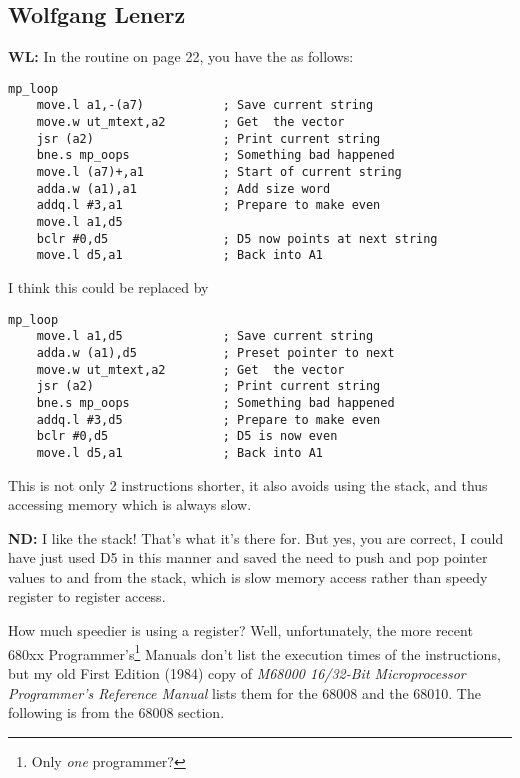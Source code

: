 \subsection{Wolfgang Lenerz}

\textbf{WL: }In the  routine on page 22, you have the  as follows:


\begin{lstlisting}[firstnumber=70,caption={Original MultiPrint}]
mp_loop
    move.l a1,-(a7)           ; Save current string
    move.w ut_mtext,a2        ; Get  the vector
    jsr (a2)                  ; Print current string
    bne.s mp_oops             ; Something bad happened
    move.l (a7)+,a1           ; Start of current string
    adda.w (a1),a1            ; Add size word
    addq.l #3,a1              ; Prepare to make even
    move.l a1,d5
    bclr #0,d5                ; D5 now points at next string
    move.l d5,a1              ; Back into A1
\end{lstlisting}

I think this could be replaced by

\begin{lstlisting}[firstnumber=71,caption={Wolfgang's MultiPrint}]
mp_loop
    move.l a1,d5              ; Save current string
    adda.w (a1),d5            ; Preset pointer to next 
    move.w ut_mtext,a2        ; Get  the vector
    jsr (a2)                  ; Print current string
    bne.s mp_oops             ; Something bad happened
    addq.l #3,d5              ; Prepare to make even
    bclr #0,d5                ; D5 is now even
    move.l d5,a1              ; Back into A1
\end{lstlisting}

This is not only 2 instructions shorter, it also avoids using the stack, and thus accessing memory which is always slow.

\textbf{ND: }I like the stack! That's what it's there for. But yes, you are correct, I could have just used D5 in this manner and saved the need to push and pop pointer values to and from the stack, which is slow memory access rather than speedy register to register access.

How much speedier is using a register? Well, unfortunately, the more recent 680xx Programmer's\footnote{Only \emph{one} programmer?} Manuals don't list the execution times of the instructions, but my old First Edition (1984) copy of \emph{M68000 16/32-Bit Microprocessor Programmer's Reference Manual} lists them for the 68008 and the 68010. The following is from the 68008 section.

